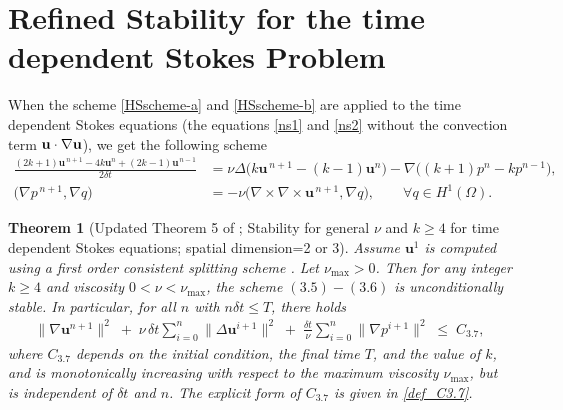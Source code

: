 \documentclass{article}
\newtheorem{theorem}{Theorem}[section]      %
\theoremstyle{definition}                   %
\begin{document}
\section{Refined Stability for the time dependent Stokes Problem}
\label{sec_stability}
When the scheme \eqref{HSscheme-a} and \eqref{HSscheme-b} are applied to the time dependent Stokes equations (the equations \eqref{ns1} and \eqref{ns2} without the convection term ${\bf u}\cdot \nabla {\bf u}$), we get the following scheme 
\begin{align}
\frac{(2k+1)\mathbf{u}^{\,n+1} 
- 4k\mathbf{u}^n+(2k-1)\mathbf{u}^{\,n-1} }{2\delta t}
&= \nu\Delta\bigl(k\mathbf{u}^{\,n+1}-(k-1)\mathbf{u}^n\bigr) -\nabla\bigl((k+1)p^n-kp^{n-1}\bigr),
\label{3.5}
\\
\bigl(\nabla p^{\,n+1},\nabla q\bigr)
&= -\nu\bigl(\nabla\times\nabla\times\mathbf{u}^{\,n+1},\nabla q\bigr),
\qquad\forall q\in H^1(\Omega).
\label{3.6}
\end{align}


\begin{theorem}[Updated Theorem 5 of \cite{HuangShen2023}; Stability for general $\nu$ and $k\ge 4$ for time dependent Stokes equations; spatial dimension=2 or 3]
\label{Theorem 5-New}
Assume $\mathbf{u}^1$ is computed using a first order consistent splitting scheme \cite{guermond2003new}. 
Let $\nu_{\max}>0$. 
Then for any integer $k\ge4$ and viscosity $0<\nu<\nu_{\max}$, the scheme $(3.5)-(3.6)$ is unconditionally stable. In particular, for all $n$ with $n\delta t\le T$, there holds
\begin{equation}
\begin{aligned}
  \|\nabla\mathbf{u}^{n+1}\|^2
  \;+\;\nu\,\delta t\sum_{i=0}^n\|\Delta\mathbf{u}^{i+1}\|^2
  \;+\;\frac{\delta t}{\nu}
    \sum_{i=0}^n
    \|\nabla p^{i+1} \|^2
  \;\le\; C_{3.7},
\end{aligned}
\label{3.7-new}  
\end{equation}
where $C_{3.7}$ depends on the initial condition, the final time $T$, and the value of $k$, and is monotonically increasing with respect to the maximum viscosity $\nu_{\max}$, but is independent of $\delta t$ and $n$. The explicit form of $C_{3.7}$ is given in \eqref{def_C3.7}.

\end{theorem}
\end{document}
